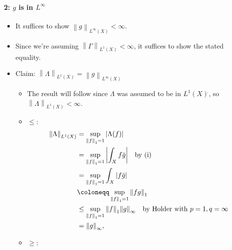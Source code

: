 \begin{solution}
\hypertarget{g-is-in-linfty}{%
\paragraph{\texorpdfstring{2: \(g\) is in
\(L^\infty\)}{2: g is in L\^{}\textbackslash infty}}\label{g-is-in-linfty}}

\begin{itemize}
\item
  It suffices to show
  \({\left\lVert {g} \right\rVert}_{L^\infty(X)} < \infty\).
\item
  Since we're assuming
  \({\left\lVert {\Gamma} \right\rVert}_{L^1(X) {}^{ \check{} }} < \infty\),
  it suffices to show the stated equality.
\item
  Claim:
  \({\left\lVert {\Lambda} \right\rVert}_{L^1(X) {}^{ \check{} }} ={\left\lVert {g} \right\rVert}_{L^\infty(X)}\)

  \begin{itemize}
  \item
    The result will follow since \(\Lambda\) was assumed to be in
    \(L^1(X) {}^{ \check{} }\), so
    \({\left\lVert {\Lambda} \right\rVert}_{L^1(X) {}^{ \check{} }} < \infty\).
  \item
    \(\leq\):
    \begin{align*}
    {\left\lVert {\Lambda} \right\rVert}_{L^1(X) {}^{ \check{} }} 
    &= \sup_{{\left\lVert {f} \right\rVert}_1 = 1} {\left\lvert {\Lambda(f)} \right\rvert} \\
    &= \sup_{{\left\lVert {f} \right\rVert}_1 = 1} {\left\lvert {\int_X f \mkern 1.5mu\overline{\mkern-1.5mug\mkern-1.5mu}\mkern 1.5mu} \right\rvert} \quad\text{by (i)}\\
    &= \sup_{{\left\lVert {f} \right\rVert}_1 = 1} \int_X {\left\lvert {f \mkern 1.5mu\overline{\mkern-1.5mug\mkern-1.5mu}\mkern 1.5mu} \right\rvert} \\
    &\coloneqq\sup_{{\left\lVert {f} \right\rVert}_1 = 1} {\left\lVert {fg} \right\rVert}_1 \\
    &\leq \sup_{{\left\lVert {f} \right\rVert}_1 = 1} {\left\lVert {f} \right\rVert}_1 {\left\lVert {g} \right\rVert}_\infty \quad\text{by Holder with } p=1,q=\infty\\
    &= {\left\lVert {g} \right\rVert}_\infty
    ,\end{align*}
  \item
    \(\geq\):


\end{itemize}
\end{itemize}
\end{solution}
